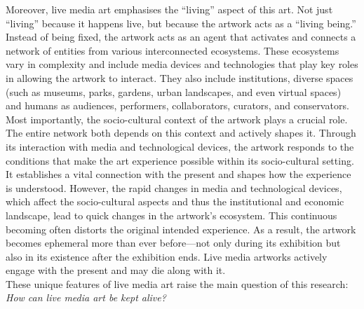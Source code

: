 Moreover, live media art emphasises the ``living'' aspect of this art. Not just ``living'' because it happens live, but because the artwork acts as a ``living being.'' Instead of being fixed, the artwork acts as an agent that activates and connects a network of entities from various interconnected ecosystems. These ecosystems vary in complexity and include media devices and technologies that play key roles in allowing the artwork to interact. They also include institutions, diverse spaces (such as museums, parks, gardens, urban landscapes, and even virtual spaces) and humans as audiences, performers, collaborators, curators, and conservators. Most importantly, the socio-cultural context of the artwork plays a crucial role. The entire network both depends on this context and actively shapes it. Through its interaction with media and technological devices, the artwork responds to the conditions that make the art experience possible within its socio-cultural setting. It establishes a vital connection with the present and shapes how the experience is understood. However, the rapid changes in media and technological devices, which affect the socio-cultural aspects and thus the institutional and economic landscape, lead to quick changes in the artwork’s ecosystem. This continuous becoming often distorts the original intended experience. As a result, the artwork becomes ephemeral more than ever before—not only during its exhibition but also in its existence after the exhibition ends. Live media artworks actively engage with the present and may die along with it.\\
These unique features of live media art raise the main question of this research: \textit{How can live media art be kept alive?}\\
